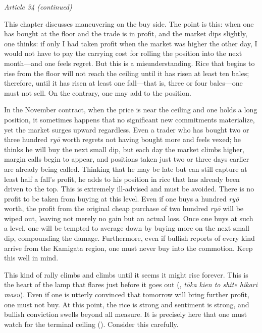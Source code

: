 \begin{sokyubox}
{\small\itshape\color{sokyubar} Article 34 (continued)}

\medskip
This chapter discusses maneuvering on the buy side. The point is
this: when one has bought at the floor and the trade is in profit,
and the market dips slightly, one thinks: if only I had taken
profit when the market was higher the other day, I would not have
to pay the carrying cost for rolling the position into the next
month---and one feels regret. But this is a misunderstanding.
Rice that begins to rise from the floor will not reach the ceiling
until it has risen at least ten bales; therefore, until it has
risen at least one fall---that is, three or four bales---one must
not sell. On the contrary, one may add to the position.
\end{sokyubox}


\begin{sokyubox}
{\small\itshape\color{sokyubar} }

\medskip
In the November contract, when the price is near the ceiling and
one holds a long position, it sometimes happens that no significant
new commitments materialize, yet the market surges upward
regardless. Even a trader who has bought two or three hundred
\textit{ry\=o} worth regrets not having bought more and feels vexed; he
thinks he will buy the next small dip, but each day the market
climbs higher, margin calls begin to appear, and positions taken
just two or three days earlier are already being called. Thinking
that he may be late but can still capture at least half a fall's
profit, he adds to his position in rice that has already been
driven to the top. This is extremely ill-advised and must be
avoided. There is no profit to be taken from buying at this level.
Even if one buys a hundred \textit{ry\=o} worth, the profit from the
original cheap purchase of two hundred \textit{ry\=o} will be wiped out,
leaving not merely no gain but an actual loss. Once one buys at
such a level, one will be tempted to average down by buying more
on the next small dip, compounding the damage. Furthermore, even
if bullish reports of every kind arrive from the Kamigata region,
one must never buy into the commotion. Keep this well in mind.

This kind of rally climbs and climbs until it seems it might rise
forever. This is the heart of the lamp that flares just before it
goes out (, \textit{t\=oka kien to shite hikari
masu}). Even if one is utterly convinced that tomorrow will bring
further profit, one must not buy. At this point, the rice is
strong and sentiment is strong, and bullish conviction swells
beyond all measure. It is precisely here that one must watch for
the terminal ceiling (). Consider this
carefully.
\end{sokyubox}

